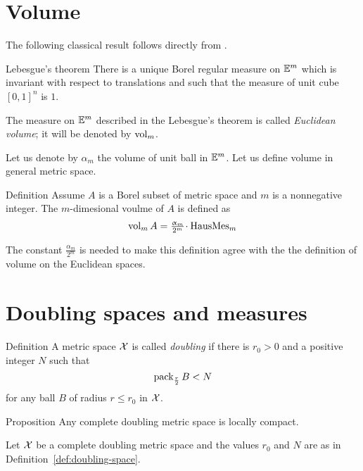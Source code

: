 \section{Volume}

The following classical result follows directly from \cite[2.7.7]{federer}.

\begin{thm}{Lebesgue's theorem}\label{thm:lebesgue}
There is a unique Borel regular  measure on $\mathbb{E}^m$
which is invariant with respect to translations
and such that the measure of unit cube $[0,1]^n$ is $1$.
\end{thm}

The measure on $\mathbb{E}^m$ described in the Lebesgue's theorem is called \emph{Euclidean volume};
it will be denoted by $\mathop{\rm vol}\nolimits_m$.

Let us denote by $\alpha_m$ the volume of unit ball in $\mathbb{E}^m$.
Let us define volume in general metric space.


\begin{thm}{Definition}\label{def:vol}
Assume $A$ is a Borel subset of metric space and $m$ is a nonnegative integer.
The $m$-dimesional voulme of $A$ is defined as 
\[\vol_mA=\tfrac{\alpha_m}{2^m}\cdot\HausMes_m\]
\end{thm}

The constant $\tfrac{\alpha_m}{2^m}$ is needed to make this definition  agree with the 
the definition of volume on the Euclidean spaces.





\section{Doubling spaces and measures}\label{sec:doubling-spaces}

\begin{thm}{Definition}\label{def:doubling-space}
A metric space $\mathcal{X}$ is called 
\emph{doubling} 
if there is $r_0>0$ 
and a positive integer $N$ 
such that 
$$\mathop{\rm pack}\nolimits_{\frac r2} B<N$$
for any ball $B$ of radius $r\le r_0$ in $\mathcal{X}$.
\end{thm}

\begin{thm}{Proposition}\label{prop:2ble=>loc.compact}
Any complete doubling metric space is locally compact.
\end{thm}

 Let $\mathcal{X}$ be a complete doubling metric space 
and the values $r_0$ and $N$ are as in  Definition~\ref{def:doubling-space}.

